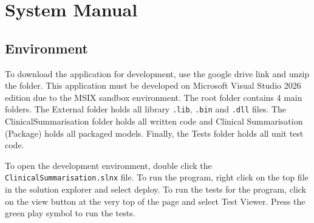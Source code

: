\chapter{System Manual}
\label{app:system_manual}
\section{Environment}
To download the application for development, use the google drive link and unzip the folder. This application must be developed on Microsoft Visual Studio 2026 edition due to the MSIX sandbox environment. The root folder contains 4 main folders. The External folder holds all library \texttt{.lib}, \texttt{.bin} and \texttt{.dll} files. The ClinicalSummarisation folder holds all written code and Clinical Summarisation (Package) holds all packaged models. Finally, the Tests folder holds all unit test code. 

To open the development environment, double click the \texttt{ClinicalSummarisation.slnx} file. To run the program, right click on the top file in the solution explorer and select deploy. To run the tests for the program, click on the view button at the very top of the page and select Test Viewer. Press the green play symbol to run the tests. 